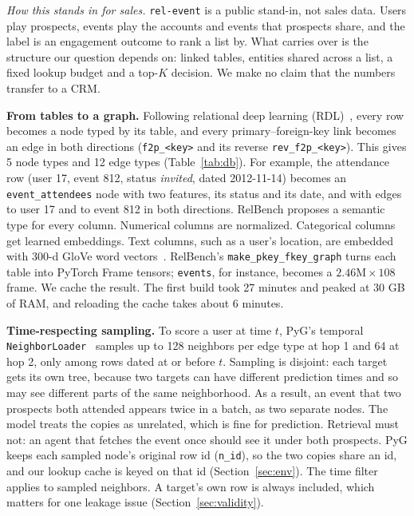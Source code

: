\documentclass{article}
\begin{document}
\emph{How this stands in for sales.} \texttt{rel-event} is a public stand-in, not sales data. Users play prospects, events play the accounts and events that prospects share, and the label is an engagement outcome to rank a list by. What carries over is the structure our question depends on: linked tables, entities shared across a list, a fixed lookup budget and a top-$K$ decision. We make no claim that the numbers transfer to a CRM.

\textbf{From tables to a graph.} Following relational deep learning (RDL)~\cite{fey2024rdl}, every row becomes a node typed by its table, and every primary--foreign-key link becomes an edge in both directions (\texttt{f2p\_<key>} and its reverse \texttt{rev\_f2p\_<key>}). This gives 5 node types and 12 edge types (Table~\ref{tab:db}). For example, the attendance row (user 17, event 812, status \emph{invited}, dated 2012-11-14) becomes an \texttt{event\_attendees} node with two features, its status and its date, and with edges to user 17 and to event 812 in both directions. RelBench proposes a semantic type for every column. Numerical columns are normalized. Categorical columns get learned embeddings. Text columns, such as a user's location, are embedded with 300-d GloVe word vectors~\cite{pennington2014glove}. RelBench's \texttt{make\_pkey\_fkey\_graph} turns each table into PyTorch Frame tensors; \texttt{events}, for instance, becomes a $2.46\text{M} \times 108$ frame. We cache the result. The first build took 27 minutes and peaked at 30 GB of RAM, and reloading the cache takes about 6 minutes.

\textbf{Time-respecting sampling.} To score a user at time $t$, PyG's temporal \texttt{NeighborLoader}~\cite{fey2019pyg} samples up to 128 neighbors per edge type at hop 1 and 64 at hop 2, only among rows dated at or before $t$. Sampling is disjoint: each target gets its own tree, because two targets can have different prediction times and so may see different parts of the same neighborhood. As a result, an event that two prospects both attended appears twice in a batch, as two separate nodes. The model treats the copies as unrelated, which is fine for prediction. Retrieval must not: an agent that fetches the event once should see it under both prospects. PyG keeps each sampled node's original row id (\texttt{n\_id}), so the two copies share an id, and our lookup cache is keyed on that id (Section~\ref{sec:env}). The time filter applies to sampled neighbors. A target's own row is always included, which matters for one leakage issue (Section~\ref{sec:validity}).
\end{document}
